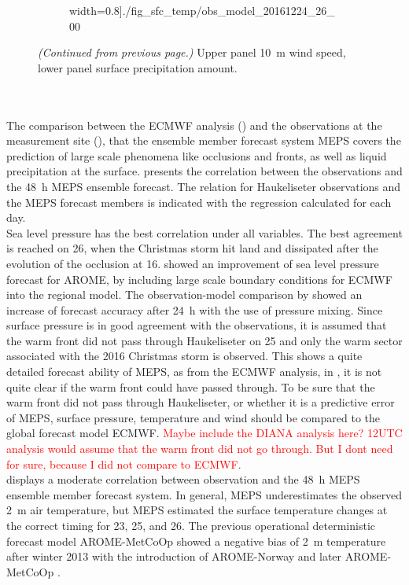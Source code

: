 \begin{figure}
\begin{subfigure}[b]{0.49\textwidth}
		width=0.8\textwidth]{./fig_sfc_temp/obs_model_20161224_26_00}
	\end{subfigure}
	\caption{\textit{(Continued from previous page.)} Upper panel \SI{10}{\metre} wind speed, lower panel surface precipitation amount. }
\end{figure}
\\
\\
The comparison between the ECMWF analysis () and the observations at the measurement site (), that the ensemble member forecast system MEPS covers the prediction of large scale phenomena like occlusions and fronts, as well as liquid precipitation at the surface.  presents the correlation between the observations and the \SI{48}{\hour} MEPS ensemble forecast. The relation for Haukeliseter observations and the MEPS forecast members is indicated with the regression calculated for each day.
\\
Sea level pressure has the best correlation under all variables. The best agreement is reached on \SI{26}{\dec}, when the Christmas storm hit land and dissipated after the evolution of the occlusion at \SI{16}{\UTC}. \citet{dahlgren_comparison_2013} showed an improvement of sea level pressure forecast for AROME, by including large scale boundary conditions for ECMWF into the regional model. The observation-model comparison by \citet{dahlgren_comparison_2013} showed an increase of forecast accuracy after \SI{24}{\hour} with the use of pressure mixing. 
Since surface pressure is in good agreement with the observations, it is assumed that the warm front did not pass through Haukeliseter on \SI{25}{\dec} and only the warm sector associated with the 2016 Christmas storm is observed. This shows a quite detailed forecast ability of MEPS, as from the ECMWF analysis, in , it is not quite clear if the warm front could have passed through. To be sure that the warm front did not pass through Haukeliseter, or whether it is a predictive error of MEPS, surface pressure, temperature and wind should be compared to the global forecast model ECMWF.
\textcolor{red}{Maybe include the DIANA analysis here? 12UTC analysis would assume that the warm front did not go through. But I dont need for sure, because I did not compare to ECMWF.} %
\\
 displays a moderate correlation between observation and the \SI{48}{\hour} MEPS ensemble member forecast system. In general, MEPS underestimates the observed \SI{2}{\metre} air temperature, but MEPS estimated the surface temperature changes at the correct timing for \num{23}, \num{25}, and \SI{26}{\dec}. The previous operational deterministic forecast model AROME-MetCoOp showed a negative bias of \SI{2}{\metre} temperature after winter 2013 with the introduction of AROME-Norway and later AROME-MetCoOp \citep{muller_arome-metcoop:_2017}. 
